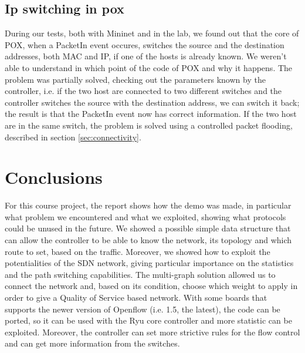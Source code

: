 \documentclass[article,10pt]{IEEEtran}
\begin{document}
\subsection{Ip switching in pox}
During our tests, both with Mininet and in the lab, we found out that the core of POX, when a PacketIn event occures, switches the source and the destination addresses,
both MAC and IP, if one of the hosts is already known. We weren't able to understand in which point of the code of POX  and why it happens.
The problem was partially solved, checking out the
parameters known by the controller, i.e. if the two host are connected to two different switches and the controller switches the source with the
destination address, we can switch it back; the result is that the PacketIn event now has correct information.
If the two host are in the same switch, the problem is solved using a controlled packet flooding, described in section \ref{sec:connectivity}.

\section{Conclusions}\label{sec:conclusion}
For this course project, the report shows how the demo was made, in particular what problem we encountered
and what we exploited, showing what protocols could be unused in the future. We showed a possible simple data structure
that can allow the controller to be able to know the network, its topology and which route to set, based on the traffic.
Moreover, we showed how to exploit the potentialities of the SDN network, giving particular importance on the
statistics and the path switching capabilities.
The multi-graph solution allowed us to connect the network and, based on its condition, choose which weight to apply
in order to give a Quality of Service based network. With some boards that supports the newer version of Openflow
(i.e. 1.5, the latest), the code can be ported, so it can be used with the Ryu core controller and more statistic can
be exploited. Moreover, the controller can set more strictive rules for the flow control and can get more information from the
switches.

\end{document}
